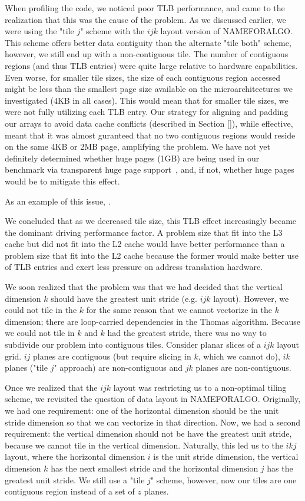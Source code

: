 \documentclass{sig-alternate-05-2015}
\begin{document}
When profiling the code, we noticed poor TLB performance, and came to the
realization that this was the cause of the problem. As we discussed earlier, we
were using the "tile \(j\)" scheme with the \(ijk\) layout version of
NAMEFORALGO. This scheme offers better data contiguity than the alternate "tile
both" scheme, however, we still end up with a non-contiguous tile.  The number
of contiguous regions (and thus TLB entries) were quite large relative to
hardware capabilities. Even worse, for smaller tile sizes, the size of each
contiguous region accessed might be less than the smallest page size available
on the microarchitectures we investigated (4KB in all cases). This would mean
that for smaller tile sizes, we were not fully utilizing each TLB entry.  Our
strategy for aligning and padding our arrays to avoid data cache conflicts
(described in Section \ref{}), while effective, meant that it was almost
guranteed that no two contiguous regions would reside on the same 4KB or 2MB
page, amplifying the problem. We have not yet definitely determined whether
huge pages (1GB) are being used in our benchmark via transparent huge page
support~\cite{}, and, if not, whether huge pages would be to mitigate this
effect.

As an example of this issue, .

We concluded that as we decreased tile size, this TLB effect increasingly
became the dominant driving performance factor. A problem size that fit into
the L3 cache but did not fit into the L2 cache would have better performance
than a problem size that fit into the L2 cache because the former would make
better use of TLB entries and exert less pressure on address translation
hardware.

We soon realized that the problem was that we had decided that the
vertical dimension \(k\) should have the greatest unit stride (e.g. \(ijk\)
layout). However, we could not tile in the \(k\) for the same reason that we
cannot vectorize in the \(k\) dimension; there are loop-carried dependencies in
the Thomas algorithm. Because we could not tile in \(k\) and \(k\) had the greatest
stride, there was no way to subdivide our problem into contiguous tiles.
Consider planar slices of a \(ijk\) layout grid. \(ij\) planes are contiguous
(but require slicing in \(k\), which we cannot do), \(ik\) planes ("tile \(j\)"
approach) are non-contiguous and \(jk\) planes are non-contiguous.

Once we realized that the \(ijk\) layout was restricting us to a non-optimal
tiling scheme, we revisited the question of data layout in NAMEFORALGO.
Originally, we had one requirement: one of the horizontal dimension should be
the unit stride dimension so that we can vectorize in that direction. Now, we
had a second requirement: the vertical dimension should not be have the
greatest unit stride, because we cannot tile in the vertical dimension.
Naturally, this led us to the \(ikj\) layout, where the horizontal dimension
\(i\) is the unit stride dimension, the vertical dimension \(k\) has the next
smallest stride and the horizontal dimension \(j\) has the greatest unit
stride. We still use a "tile \(j\)" scheme, however, now our tiles are one
contiguous region instead of a set of \(z\) planes.
\end{document}
